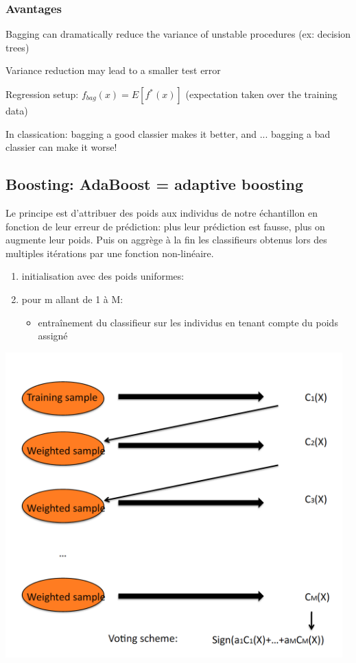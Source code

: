 \documentclass[a4paper]{article}
\theoremstyle{plain}
\begin{document}
\subsubsection{Avantages}
Bagging can dramatically reduce the variance of unstable
procedures (ex: decision trees)

Variance reduction may lead to a smaller test error

Regression setup: $f_{bag}(x) = E[f^*(x)]$ (expectation taken over the training data)

In classication:
bagging a good classier makes it better, and ...
bagging a bad classier can make it worse!

\subsection{Boosting: AdaBoost = adaptive boosting}

Le principe est d'attribuer des poids aux individus de notre échantillon en fonction de leur erreur de prédiction: plus leur prédiction est fausse, plus on augmente leur poids.
Puis on aggrège à la fin les classifieurs obtenus lors des multiples itérations par une fonction non-linéaire.

\begin{enumerate}
\item initialisation avec des poids uniformes: 
\item pour m allant de 1 à M:
\begin{itemize}
\item entraînement du classifieur sur les individus en tenant compte du poids assigné
\end{itemize}
\end{enumerate}

\includegraphics[width=13cm]{Adaboost.png}
\end{document}
